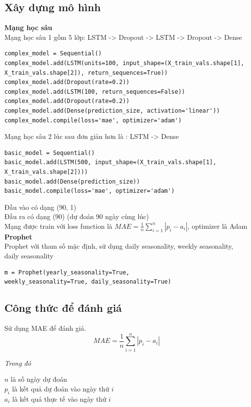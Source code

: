 \subsection{Xây dựng mô hình}
\textbf{Mạng học sâu} \\
Mạng học sâu 1 gồm 5 lớp: LSTM -> Dropout -> LSTM -> Dropout -> Dense \\
\begin{verbatim}
complex_model = Sequential()
complex_model.add(LSTM(units=100, input_shape=(X_train_vals.shape[1],
X_train_vals.shape[2]), return_sequences=True))
complex_model.add(Dropout(rate=0.2))
complex_model.add(LSTM(100, return_sequences=False))
complex_model.add(Dropout(rate=0.2))
complex_model.add(Dense(prediction_size, activation='linear'))
complex_model.compile(loss='mae', optimizer='adam')
\end{verbatim}
Mạng học sâu 2 lúc sau đơn giản hơn là : LSTM -> Dense \\
\begin{verbatim}
basic_model = Sequential()
basic_model.add(LSTM(500, input_shape=(X_train_vals.shape[1],
X_train_vals.shape[2])))
basic_model.add(Dense(prediction_size))
basic_model.compile(loss='mae', optimizer='adam')
\end{verbatim}
Đầu vào có dạng (90, 1) \\
Đầu ra có dạng (90) (dự đoán 90 ngày cùng lúc) \\
Mạng được train với loss function là \(MAE = \frac{1}{n}\sum_{i=1}^{n}|p_i - a_i|\), optimizer là Adam \\
\textbf{Prophet} \\
Prophet với tham số mặc định, sử dụng daily seasonality, weekly seasonality, daily seasonality \\
\begin{verbatim}
m = Prophet(yearly_seasonality=True, 
weekly_seasonality=True, daily_seasonality=True)
\end{verbatim}
\subsection{Công thức để đánh giá}
Sử dụng MAE để đánh giá. \\
\[MAE = \frac{1}{n}\sum_{i=1}^{n}|p_i - a_i|\]
\begin{minipage}[t]{.27\textwidth}
	\textit{Trong đó}
\end{minipage}
\hspace*{15pt}
\begin{minipage}[t]{.65\textwidth}
	\(n\) là số ngày dự đoán \\
	\(p_i\) là kết quả dự đoán vào ngày thứ \(i\) \\
	\(a_i\) là kết quả thực tế vào ngày thứ \(i\) \\
\end{minipage} \\[5mm]


